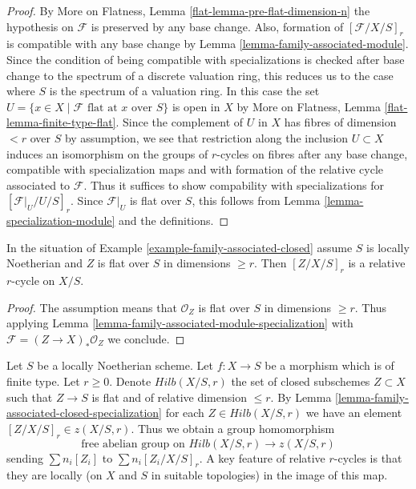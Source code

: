 \begin{proof}
By More on Flatness, Lemma \ref{flat-lemma-pre-flat-dimension-n}
the hypothesis on $\mathcal{F}$ is preserved by any base change.
Also, formation of $[\mathcal{F}/X/S]_r$ is compatible with any
base change by Lemma \ref{lemma-family-associated-module}.
Since the condition of being compatible with specializations
is checked after base change to the spectrum of a discrete valuation ring,
this reduces us to the case where $S$ is the spectrum of a valuation ring.
In this case the set
$U = \{x \in X \mid \mathcal{F}\text{ flat at }x\text{ over }S\}$
is open in $X$ by
More on Flatness, Lemma \ref{flat-lemma-finite-type-flat}.
Since the complement of $U$ in $X$ has fibres of dimension $< r$ over
$S$ by assumption, we see that restriction along the inclusion
$U \subset X$ induces an isomorphism on the groups of $r$-cycles
on fibres after any base change, compatible with specialization maps
and with formation of the relative cycle associated to $\mathcal{F}$.
Thus it suffices to show compability with
specializations for $[\mathcal{F}|_U / U /S]_r$.
Since $\mathcal{F}|_U$ is flat over $S$, this follows from
Lemma \ref{lemma-specialization-module} and the definitions.
\end{proof}

\begin{lemma}
\label{lemma-family-associated-closed-specialization}
In the situation of Example \ref{example-family-associated-closed}
assume $S$ is locally Noetherian and $Z$ is flat over $S$ in dimensions
$\geq r$. Then $[Z/X/S]_r$ is a relative $r$-cycle on $X/S$.
\end{lemma}

\begin{proof}
The assumption means that $\mathcal{O}_Z$ is flat over $S$ in
dimensions $\geq r$. Thus applying
Lemma \ref{lemma-family-associated-module-specialization}
with $\mathcal{F} = (Z \to X)_*\mathcal{O}_Z$ we conclude.
\end{proof}

\noindent
Let $S$ be a locally Noetherian scheme. Let $f : X \to S$ be a morphism
which is of finite type. Let $r \geq 0$. Denote $Hilb(X/S, r)$
the set of closed subschemes $Z \subset X$ such that $Z \to S$ is flat
and of relative dimension $\leq r$. By
Lemma \ref{lemma-family-associated-closed-specialization} for each
$Z \in Hilb(X/S, r)$ we have an element $[Z/X/S]_r \in z(X/S, r)$.
Thus we obtain a group homomorphism
\begin{equation}
\label{equation-cycle-classes}
\text{free abelian group on }Hilb(X/S, r) \longrightarrow z(X/S, r)
\end{equation}
sending $\sum n_i[Z_i]$ to $\sum n_i[Z_i/X/S]_r$.
A key feature of relative $r$-cycles is that they are locally
(on $X$ and $S$ in suitable topologies) in the image of this map.

